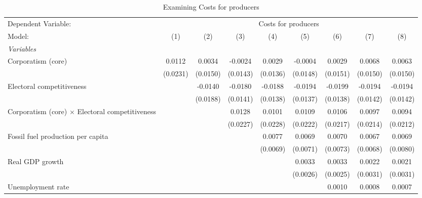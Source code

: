 
\begin{table}[htbp]
   \caption{Examining Costs for producers}
   \centering
   \begin{tabular}{lcccccccc}
      \tabularnewline \midrule \midrule
      Dependent Variable: & \multicolumn{8}{c}{Costs for producers}\\
      Model:                                                 & (1)      & (2)      & (3)      & (4)      & (5)      & (6)      & (7)      & (8)\\  
      \midrule
      \emph{Variables}\\
      Corporatism (core)                                     & 0.0112   & 0.0034   & -0.0024  & 0.0029   & -0.0004  & 0.0029   & 0.0068   & 0.0063\\   
                                                             & (0.0231) & (0.0150) & (0.0143) & (0.0136) & (0.0148) & (0.0151) & (0.0150) & (0.0150)\\   
      Electoral competitiveness                              &          & -0.0140  & -0.0180  & -0.0188  & -0.0194  & -0.0199  & -0.0194  & -0.0194\\   
                                                             &          & (0.0188) & (0.0141) & (0.0138) & (0.0137) & (0.0138) & (0.0142) & (0.0142)\\   
      Corporatism (core) $\times$ Electoral competitiveness  &          &          & 0.0128   & 0.0101   & 0.0109   & 0.0106   & 0.0097   & 0.0094\\   
                                                             &          &          & (0.0227) & (0.0228) & (0.0222) & (0.0217) & (0.0214) & (0.0212)\\   
      Fossil fuel production per capita                      &          &          &          & 0.0077   & 0.0069   & 0.0070   & 0.0067   & 0.0069\\   
                                                             &          &          &          & (0.0069) & (0.0071) & (0.0073) & (0.0068) & (0.0080)\\   
      Real GDP growth                                        &          &          &          &          & 0.0033   & 0.0033   & 0.0022   & 0.0021\\   
                                                             &          &          &          &          & (0.0026) & (0.0025) & (0.0031) & (0.0031)\\   
      Unemployment rate                                      &          &          &          &          &          & 0.0010   & 0.0008   & 0.0007\\   

\end{tabular}
\end{table}

